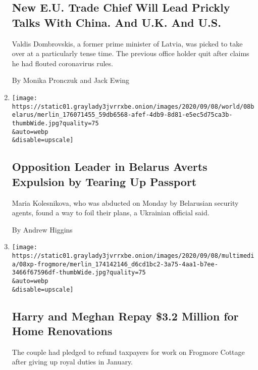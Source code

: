 \begin{enumerate}
{  \subsection{New E.U. Trade Chief Will Lead Prickly Talks With China.
  And U.K. And
  U.S.}\label{new-eu-trade-chief-will-lead-prickly-talks-with-china-and-uk-and-us}}

  Valdis Dombrovskis, a former prime minister of Latvia, was picked to
  take over at a particularly tense time. The previous office holder
  quit after claims he had flouted coronavirus rules.

  By Monika Pronczuk and Jack Ewing
\item
  \href{/2020/09/08/world/europe/belarus-maria-kolesnikova.html}{}

  \texttt{[image: https://static01.graylady3jvrrxbe.onion/images/2020/09/08/world/08belarus/merlin\_176071455\_59db6568-afef-4db9-8d81-e5ec5d75ca3b-thumbWide.jpg?quality=75\\\&auto=webp\\\&disable=upscale]}

  \hypertarget{opposition-leader-in-belarus-averts-expulsion-by-tearing-up-passport}{%
  \subsection{Opposition Leader in Belarus Averts Expulsion by Tearing
  Up
  Passport}\label{opposition-leader-in-belarus-averts-expulsion-by-tearing-up-passport}}

  Maria Kolesnikova, who was abducted on Monday by Belarusian security
  agents, found a way to foil their plans, a Ukrainian official said.

  By Andrew Higgins
\item
  \href{/2020/09/08/world/europe/harry-meghan-frogmore-cottage.html}{}

  \texttt{[image: https://static01.graylady3jvrrxbe.onion/images/2020/09/08/multimedia/08xp-frogmore/merlin\_174142146\_d6cd1bc2-3a75-4aa1-b7ee-3466f67596df-thumbWide.jpg?quality=75\\\&auto=webp\\\&disable=upscale]}

  \hypertarget{harry-and-meghan-repay-32-million-for-home-renovations}{%
  \subsection{Harry and Meghan Repay \$3.2 Million for Home
  Renovations}\label{harry-and-meghan-repay-32-million-for-home-renovations}}

  The couple had pledged to refund taxpayers for work on Frogmore
  Cottage after giving up royal duties in January.


\end{enumerate}
